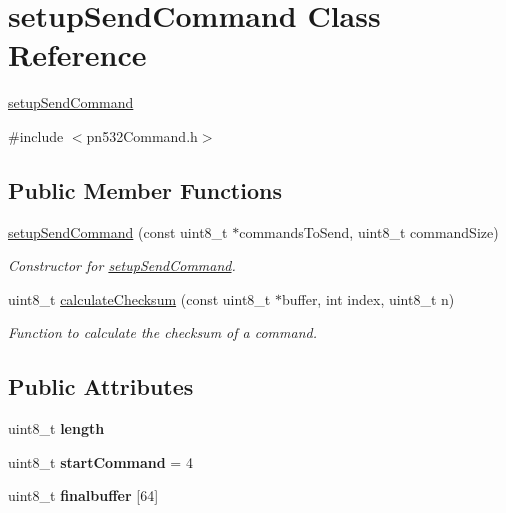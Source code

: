 \hypertarget{classsetupSendCommand}{}\section{setup\+Send\+Command Class Reference}
\label{classsetupSendCommand}


\hyperlink{classsetupSendCommand}{setup\+Send\+Command}  




{\ttfamily \#include $<$pn532\+Command.\+h$>$}

\subsection*{Public Member Functions}
\begin{DoxyCompactItemize}
\item 
\hyperlink{classsetupSendCommand_ab61ddb3490a81ce23199f38bf01c5474}{setup\+Send\+Command} (const uint8\+\_\+t $\ast$commands\+To\+Send, uint8\+\_\+t command\+Size)
\begin{DoxyCompactList}\small\item\em Constructor for \hyperlink{classsetupSendCommand}{setup\+Send\+Command}. \end{DoxyCompactList}\item 
uint8\+\_\+t \hyperlink{classsetupSendCommand_ac31e42b6848a7cee79b23924759753b9}{calculate\+Checksum} (const uint8\+\_\+t $\ast$buffer, int index, uint8\+\_\+t n)
\begin{DoxyCompactList}\small\item\em Function to calculate the checksum of a command. \end{DoxyCompactList}\end{DoxyCompactItemize}
\subsection*{Public Attributes}
\begin{DoxyCompactItemize}
\item 
\mbox{\label{classsetupSendCommand_aeab654e713acac334513eb7c6b1df207}} 
uint8\+\_\+t {\bfseries length}
\item 
\mbox{\label{classsetupSendCommand_a8621e212594dd292d12ed8982290b155}} 
uint8\+\_\+t {\bfseries start\+Command} = 4
\item 
\mbox{\label{classsetupSendCommand_a905d7bb6c142fe21bbfb7f364c9193a6}} 
uint8\+\_\+t {\bfseries finalbuffer} \mbox{[}64\mbox{]}
\end{DoxyCompactItemize}



